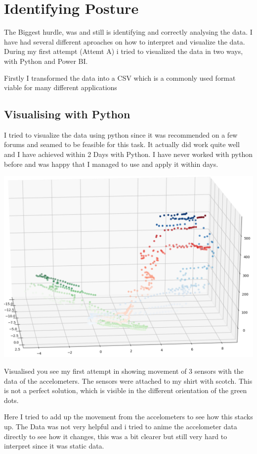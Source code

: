 \section{Identifying Posture}

The Biggest hurdle, was and still is identifying and correctly analysing the data. I have had several different aproaches on how to interpret and visualize the data. During my first attempt (Attemt A) i tried to visualized the data in two ways, with Python and Power BI.

Firstly I transformed the data into a CSV which is a commonly used format viable for many different applications

\subsection{Visualising with Python}

I tried to visualize the data using python since it was recommended on a few forums and seamed to be feasible for this task. It actually did work quite well and I have achieved within 2 Days with Python. I have never worked with python before and was happy that I managed to use and apply it within days. 

\includegraphics[width=\linewidth]{images/PyVisualisation.png}

Visualised you see my first attempt in showing movement of 3 sensors with the data of the accelometers. The sensors were attached to my shirt with scotch. This is not a perfect solution, which is visible in the different orientation of the green dots. 

Here I tried to add up the movement from the accelometers to see how this stacks up. The Data was not very helpful and i tried to anime the accelometer data directly to see how it changes, this was a bit clearer but still very hard to interpret since it was static data. 


